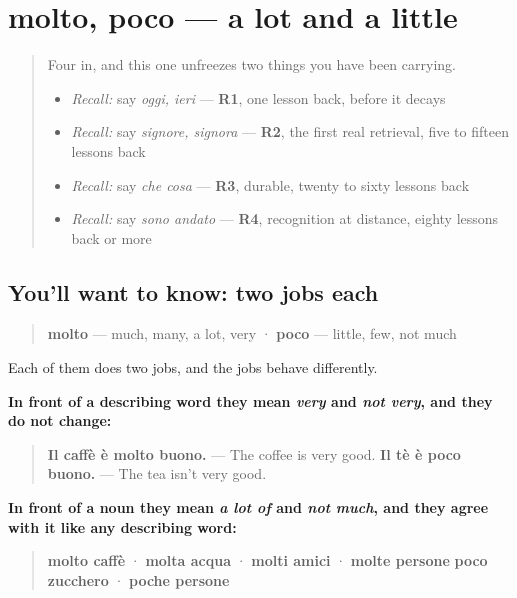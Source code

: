 \section[molto, poco]{molto, poco — a lot and a little}

\label{lesson:IT-C35-molto-poco}



\begin{quote}
Four in, and this one unfreezes two things you have been carrying.

\begin{itemize}
\raggedright
  \item \emph{Recall:} say \emph{oggi, ieri} — \textbf{R1}, one lesson back, before it decays
  \item \emph{Recall:} say \emph{signore, signora} — \textbf{R2}, the first real retrieval, five to fifteen lessons back
  \item \emph{Recall:} say \emph{che cosa} — \textbf{R3}, durable, twenty to sixty lessons back
  \item \emph{Recall:} say \emph{sono andato} — \textbf{R4}, recognition at distance, eighty lessons back or more
\end{itemize}
\end{quote}

\subsection*{You'll want to know: two jobs each}
\begin{quote}
\textbf{molto} — much, many, a lot, very · \textbf{poco} — little, few, not much
\end{quote}

Each of them does two jobs, and the jobs behave differently.

\textbf{In front of a describing word they mean \emph{very} and \emph{not very}, and they do not change:}

\begin{quote}
\textbf{Il caffè è molto buono.} — The coffee is very good. \textbf{Il tè è poco buono.} — The tea isn't very good.
\end{quote}

\textbf{In front of a noun they mean \emph{a lot of} and \emph{not much}, and they agree with it like any describing word:}

\begin{quote}
\textbf{molto caffè} · \textbf{molta acqua} · \textbf{molti amici} · \textbf{molte persone} \textbf{poco zucchero} · \textbf{poche persone}
\end{quote}

